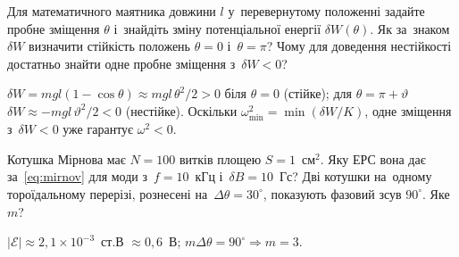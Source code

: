 \begin{problem}\label{prb:EnergyPrinciplePendulum}
Для математичного маятника довжини $l$ у~перевернутому положенні задайте пробне зміщення $\theta$ і~знайдіть
зміну потенціальної енергії $\delta W(\theta)$. Як за~знаком $\delta W$ визначити стійкість положень
$\theta=0$ і~$\theta=\pi$? Чому для доведення нестійкості достатньо знайти одне пробне зміщення з~$\delta W<0$?
	\begin{solution}
		$\delta W=mgl(1-\cos\theta)\approx mgl\,\theta^2/2>0$ біля $\theta=0$ (стійке); для $\theta=\pi+\vartheta$
$\delta W\approx-mgl\,\vartheta^2/2<0$ (нестійке). Оскільки $\omega^2_{\min}=\min(\delta W/K)$, одне зміщення з~$\delta W<0$ уже гарантує $\omega^2<0$.
	\end{solution}
\end{problem}

\begin{problem}\label{prb:MirnovCoil}
Котушка Мірнова має $N=100$ витків площею $S=1$~см$^2$. Яку ЕРС вона дає за~\eqref{eq:mirnov} для моди з~$f=10$~кГц і~$\delta B=10$~Гс? Дві котушки на~одному тороїдальному перерізі, рознесені на~$\Delta\theta=30^\circ$, показують фазовий зсув $90^\circ$. Яке $m$?
	\begin{solution}
		$|\mathcal E|\approx2{,}1\times10^{-3}$~ст.В $\approx0{,}6$~В; $m\Delta\theta=90^\circ\Rightarrow m=3$.
	\end{solution}
\end{problem}


